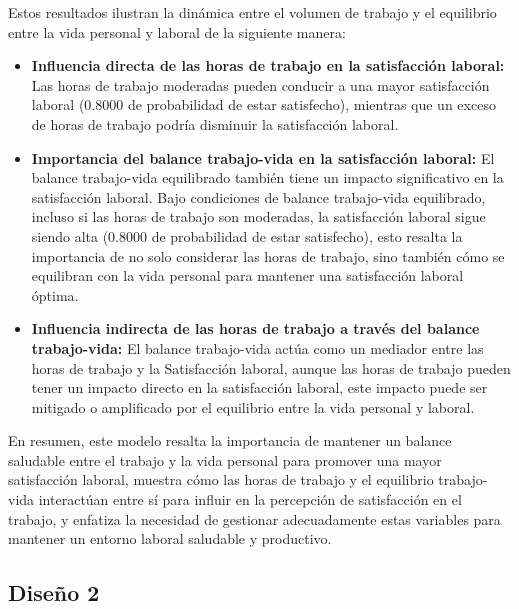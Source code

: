 Estos resultados ilustran la dinámica entre el volumen de trabajo y el equilibrio entre la vida personal y laboral de la siguiente manera:

\begin{itemize}
    \item \textbf{Influencia directa de las horas de trabajo en la satisfacción laboral:}
    Las horas de trabajo moderadas pueden conducir a una mayor satisfacción laboral (0.8000 de probabilidad de estar satisfecho), mientras que un exceso de horas de trabajo podría disminuir la satisfacción laboral.

    \item \textbf{Importancia del balance trabajo-vida en la satisfacción laboral:}
    El balance trabajo-vida equilibrado también tiene un impacto significativo en la satisfacción laboral. Bajo condiciones de balance trabajo-vida equilibrado, incluso si las horas de trabajo son moderadas, la satisfacción laboral sigue siendo alta (0.8000 de probabilidad de estar satisfecho), esto resalta la importancia de no solo considerar las horas de trabajo, sino también cómo se equilibran con la vida personal para mantener una satisfacción laboral óptima.

    \item \textbf{Influencia indirecta de las horas de trabajo a través del balance trabajo-vida:}
    El balance trabajo-vida actúa como un mediador entre las horas de trabajo y la Satisfacción laboral, aunque las horas de trabajo pueden tener un impacto directo en la satisfacción laboral, este impacto puede ser mitigado o amplificado por el equilibrio entre la vida personal y laboral.
\end{itemize}


En resumen, este modelo resalta la importancia de mantener un balance saludable entre el trabajo y la vida personal para promover una mayor satisfacción laboral, muestra cómo las horas de trabajo y el equilibrio trabajo-vida interactúan entre sí para influir en la percepción de satisfacción en el trabajo, y enfatiza la necesidad de gestionar adecuadamente estas variables para mantener un entorno laboral saludable y productivo.


\subsection{Diseño 2}

